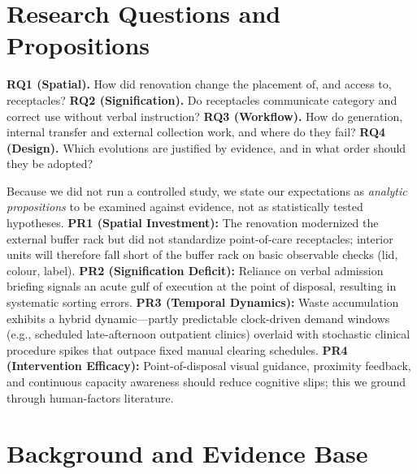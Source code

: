 \documentclass[10pt,twocolumn,a4paper]{article}
\begin{document}
\section{Research Questions and Propositions}
\textbf{RQ1 (Spatial).} How did renovation change the placement of, and access to, receptacles? \textbf{RQ2 (Signification).} Do receptacles communicate category and correct use without verbal instruction? \textbf{RQ3 (Workflow).} How do generation, internal transfer and external collection work, and where do they fail? \textbf{RQ4 (Design).} Which evolutions are justified by evidence, and in what order should they be adopted?

Because we did not run a controlled study, we state our expectations as \emph{analytic propositions} to be examined against evidence, not as statistically tested hypotheses. \textbf{PR1 (Spatial Investment):} The renovation modernized the external buffer rack but did not standardize point-of-care receptacles; interior units will therefore fall short of the buffer rack on basic observable checks (lid, colour, label). \textbf{PR2 (Signification Deficit):} Reliance on verbal admission briefing signals an acute gulf of execution at the point of disposal, resulting in systematic sorting errors. \textbf{PR3 (Temporal Dynamics):} Waste accumulation exhibits a hybrid dynamic---partly predictable clock-driven demand windows (e.g., scheduled late-afternoon outpatient clinics) overlaid with stochastic clinical procedure spikes that outpace fixed manual clearing schedules. \textbf{PR4 (Intervention Efficacy):} Point-of-disposal visual guidance, proximity feedback, and continuous capacity awareness should reduce cognitive slips; this we ground through human-factors literature.

\section{Background and Evidence Base}
\end{document}
